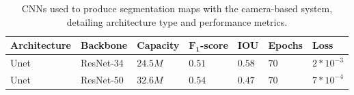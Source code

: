 \begin{table}[htbp]
\caption{CNNs used to produce segmentation maps with the camera-based system, detailing architecture type and performance metrics.}
\centering
\begin{tabular}{lllllll}
\toprule
\textbf{Architecture} & \textbf{Backbone}  & \textbf{Capacity} & \textbf{$\mathbf{F_{1}}$\hyp{}score}   & \textbf{IOU}  & \textbf{Epochs} & \textbf{Loss} \\
\midrule
Unet                  & ResNet-34          & $24.5M$           & $0.51$                                 & $0.58$         & $70$           & $2*10^{-3}$   \\
Unet                  & ResNet-50          & $32.6M$           & $0.54$                                 & $0.47$         & $70$           & $7*10^{-4}$   \\
\bottomrule
\end{tabular}
\label{tab:cog-model}
\end{table}